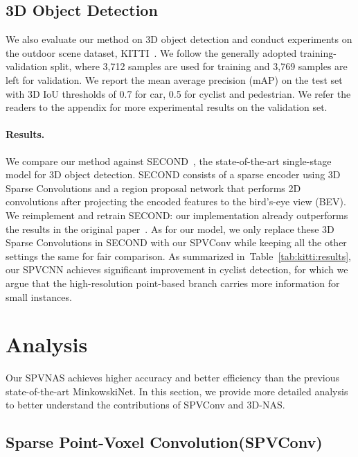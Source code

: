 \documentclass[runningheads]{llncs}
\newcommand{\tab}[1]{Table~\ref{#1}}
\def\module{Sparse Point-Voxel Convolution\xspace}
\def\moduleshort{SPVConv\xspace}
\def\cnnshort{SPVCNN\xspace}
\def\modelshort{SPVNAS\xspace}
\def\nasshort{3D-NAS\xspace}
\begin{document}
\subsection{3D Object Detection}

We also evaluate our method on 3D object detection and conduct experiments on the outdoor scene dataset, KITTI~\cite{geiger2013vision}. We follow the generally adopted training-validation split, where 3,712 samples are used for training and 3,769 samples are left for validation. We report the mean average precision (mAP) on the test set with 3D IoU thresholds of 0.7 for car, 0.5 for cyclist and pedestrian. We refer the readers to the appendix for more experimental results on the validation set.

\paragraph{Results.}

We compare our method against SECOND~\cite{yan2018second}, the state-of-the-art single-stage model for 3D object detection. SECOND consists of a sparse encoder using 3D Sparse Convolutions and a region proposal network that performs 2D convolutions after projecting the encoded features to the bird's-eye view (BEV). We reimplement and retrain SECOND: our implementation already outperforms the results in the original paper~\cite{yan2018second}. As for our model, we only replace these 3D Sparse Convolutions in SECOND with our SPVConv while keeping all the other settings the same for fair comparison. As summarized in~\tab{tab:kitti:results}, our \cnnshort achieves significant improvement in cyclist detection, for which we argue that the high-resolution point-based branch carries more information for small instances. \section{Analysis}

Our \modelshort achieves higher accuracy and better efficiency than the previous state-of-the-art MinkowskiNet. In this section, we provide more detailed analysis to better understand the contributions of \moduleshort and \nasshort.

\subsection{\module (\moduleshort)}
\end{document}
